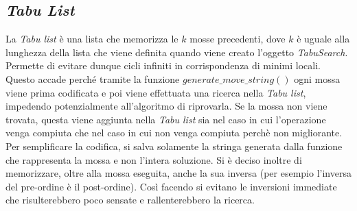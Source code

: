 \subsection{\textit{Tabu List}}
\label{sec:tabu-list}
\noindent La \textit{Tabu list} \cite{site:dispense-de-giovanni} è una lista che memorizza le $k$ mosse precedenti, dove $k$ è uguale
alla lunghezza della lista che viene definita quando viene creato l'oggetto \textit{TabuSearch}.\\
Permette di evitare dunque cicli infiniti in corrispondenza
di minimi locali. Questo accade perché tramite la funzione
$generate\_move\_string()$ ogni mossa
viene prima codificata e poi viene effettuata una ricerca nella \textit{Tabu list}, impedendo potenzialmente all’algoritmo di riprovarla.
Se la mossa non viene trovata, questa viene aggiunta nella \textit{Tabu list} sia nel caso in cui l'operazione venga compiuta che nel caso in cui non
venga compiuta perchè non migliorante.\\
Per semplificare la codifica, si salva solamente la stringa generata dalla funzione che rappresenta la mossa e non l’intera
soluzione.
Si è deciso inoltre di memorizzare, oltre alla mossa eseguita, anche la sua inversa
(per esempio l'inversa del pre-ordine è il post-ordine). Così facendo si
evitano le inversioni immediate che risulterebbero poco sensate e rallenterebbero la ricerca.

